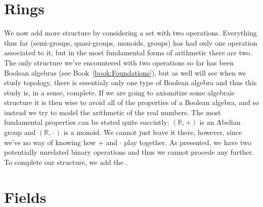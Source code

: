 \begingroup
    \ifcsname\PATH\endcsname
        \newcommand{\PATH}{books/Algebra/Ring_Theory}
        \newcommand{\OLDPATH}{\PATH}
    \else
        \newcommand{\OLDPATH}{\PATH}
        \renewcommand{\PATH}{books/Algebra/Ring_Theory}
    \fi
    \chapter{Rings}
        We now add more structure by considering a set with two operations.
        Everything thus far (semi-groups, quasi-groups, monoids, groups) has
        had only one operation associated to it, but in the most fundamental
        forms of arithmetic there are two. The only structure we've encountered
        with two operations so far has been Boolean algebras
        (see Book~\ref{book:Foundations}), but as well will see when we study
        topology, there is essentialy only one type of Boolean algebra and thus
        this study is, in a sense, complete. If we are going to axiomitize some
        algebraic structure it is then wise to avoid all of the properties of
        a Boolean algebra, and so instead we try to model the arithmetic of the
        real numbers. The most fundamental properties can be stated quite
        succintly: $(\mathbb{R},+)$ is an Abelian group and
        $(\mathbb{R},\cdot\,)$ is a monoid. We cannot just leave it there,
        however, since we've no way of knowing how $+$ and $\cdot$ play
        together. As presented, we have two potentially unrelated binary
        operations and thus we cannot procede any further. To complete our
        structure, we add the
        .
        
        
    \chapter{Fields}
        
    \renewcommand{\PATH}{\OLDPATH}
\endgroup